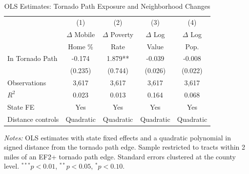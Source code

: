 \begin{table}[t]
\centering
\caption{OLS Estimates: Tornado Path Exposure and Neighborhood Changes}
\label{tab:ols}
\begin{tabular}{lcccc}
\hline\hline
 & (1) & (2) & (3) & (4) \\
 & $\Delta$ Mobile & $\Delta$ Poverty & $\Delta$ Log & $\Delta$ Log \\
 & Home \% & Rate & Value & Pop. \\
\hline
In Tornado Path & -0.174 & 1.879** & -0.039 & -0.008 \\
 & (0.235) & (0.744) & (0.026) & (0.022) \\
\hline
Observations & 3,617 & 3,617 & 3,617 & 3,617 \\
$R^2$ & 0.023 & 0.013 & 0.164 & 0.068 \\
State FE & Yes & Yes & Yes & Yes \\
Distance controls & Quadratic & Quadratic & Quadratic & Quadratic \\
\hline\hline
\end{tabular}
\vspace{0.3em}
\raggedright\footnotesize
\textit{Notes:} OLS estimates with state fixed effects and a quadratic polynomial in signed distance from the tornado path edge. Sample restricted to tracts within 2 miles of an EF2+ tornado path edge. Standard errors clustered at the county level. $^{***}p<0.01$, $^{**}p<0.05$, $^{*}p<0.10$.
\end{table}
